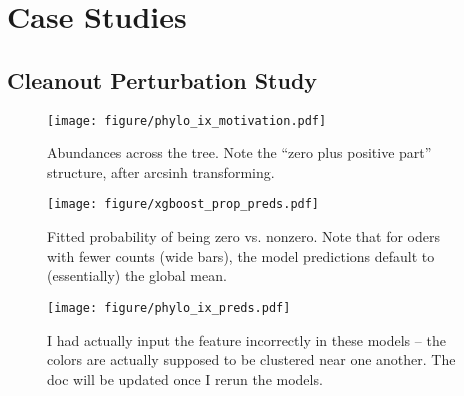 \documentclass{article}
\begin{document}
\section{Case Studies}

\subsection{Cleanout Perturbation Study}

\begin{figure}[ht]
  \centering
  \texttt{[image: figure/phylo\_ix\_motivation.pdf]}
  \caption{Abundances across the tree. Note the ``zero plus positive part'' structure, after arcsinh transforming. \label{fig:label} }
\end{figure}


\begin{figure}[ht]
  \centering
  \texttt{[image: figure/xgboost\_prop\_preds.pdf]}
  \caption{Fitted probability of being zero vs. nonzero. Note that for oders with fewer counts (wide bars), the model predictions default to (essentially) the global mean.\label{fig:label} }
\end{figure}

\begin{figure}[ht]
  \centering
  \texttt{[image: figure/phylo\_ix\_preds.pdf]}
  \caption{I had actually input the feature incorrectly in these models -- the colors are actually supposed to be clustered near one another. The doc will be updated once I rerun the models. \label{fig:label} }
\end{figure}



\end{document}
